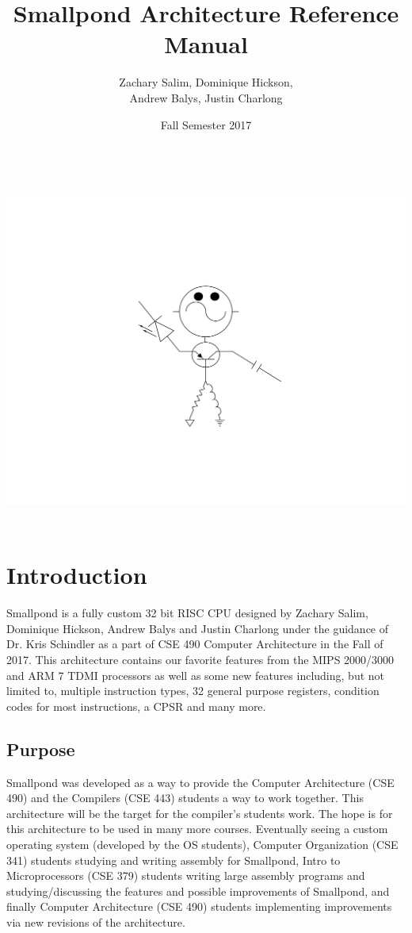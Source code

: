 \documentclass[12pt]{article}
\title{Smallpond Architecture Reference Manual}
\author{Zachary Salim, Dominique Hickson,\\ Andrew Balys, Justin Charlong}
\date{Fall Semester 2017}
\begin{document}
\maketitle

\begin{center}
    \includegraphics[width=15cm, height=11.6cm]{Volty.png}
\end{center}

\newpage
\tableofcontents

\newpage
\section{Introduction}
Smallpond is a fully custom 32 bit RISC CPU designed by Zachary Salim, Dominique Hickson, Andrew Balys and Justin Charlong under the guidance of Dr. Kris Schindler as a part of CSE 490 Computer Architecture in the Fall of 2017. This architecture contains our favorite features from the MIPS 2000/3000 and ARM 7 TDMI processors as well as some new features including, but not limited to, multiple instruction types, 32 general purpose registers, condition codes for most instructions, a CPSR and many more.
    \subsection{Purpose}
    Smallpond was developed as a way to provide the Computer Architecture (CSE 490) and the Compilers (CSE 443) students a way to work together. This architecture will be the target for the compiler's students work. The hope is for this architecture to be used in many more courses. Eventually seeing a custom operating system (developed by the OS students), Computer Organization (CSE 341) students studying and writing assembly for Smallpond, Intro to Microprocessors (CSE 379) students writing large assembly programs and studying/discussing the features and possible improvements of Smallpond, and finally Computer Architecture (CSE 490) students implementing improvements via new revisions of the architecture. 
    
\end{document}
